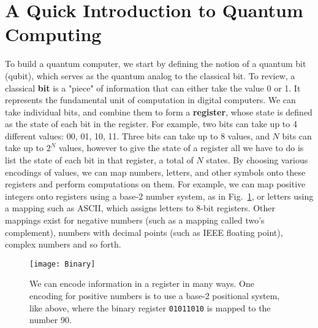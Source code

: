 \section{A Quick Introduction to Quantum Computing}
\label{sec:qc}
To build a quantum computer, we start by defining the notion of a quantum bit (qubit), which
serves as the quantum analog to the classical bit. To review, a classical \textbf{bit} is a "piece" of information
that can either take the value 0 or 1. It represents the fundamental unit of computation in digital computers.
We can take individual bits, and combine them to form a \textbf{register}, whose state is defined as
the state of each bit in the register. For example, two bits can take up to 4 different
values: 00, 01, 10, 11. Three bits can take up to 8 values, and $N$ bits can take up to $2^N$ values, however
to give the state of a register all we have to do is list the state of each bit in that register, a total of $N$ states.
By choosing various encodings of values, we can map numbers, letters, and other symbols onto these registers
and perform computations on them. For example, we can map positive integers onto registers using a base-2 number
system, as in Fig.~\ref{fig:binary}, or letters using a mapping such as ASCII, which assigns letters to 8-bit registers.
Other mappings exist for negative numbers (such as a mapping called two's complement), numbers with
decimal points (such as IEEE floating point), complex numbers and so forth.

\begin{figure}
  \texttt{[image: Binary]}
  \caption[Binary coding]
  {We can encode information in a register in many ways. One encoding for positive numbers is to use a base-2
  positional system, like above, where the binary register \texttt{01011010} is mapped to the number 90.}
  \label{fig:binary}
\end{figure}

